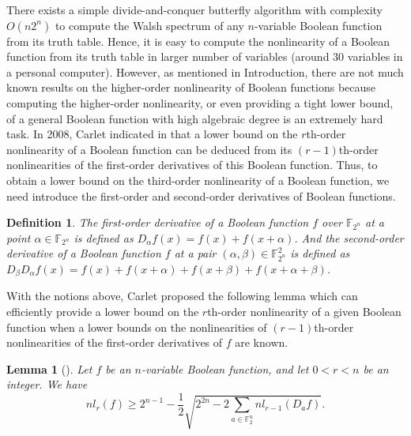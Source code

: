 \documentclass{article}
\newcommand{\F}{\mathbb{F}}
\newcommand{\0}{\textbf{0}}
\newcommand{\1}{\textbf{1}}
\theoremstyle{plain}
\newtheorem{lemma}{Lemma}
\newtheorem{definition}{Definition}
\begin{document}
    There exists a simple divide-and-conquer butterfly algorithm with complexity $O(n2^n)$ to compute the Walsh spectrum of any $n$-variable Boolean function from its truth table. 
    Hence, it is easy to compute the nonlinearity of a Boolean function from its truth table in larger number of variables (around $30$ variables in a personal computer). 
    However, as mentioned in Introduction, there are not much known results on the higher-order nonlinearity of Boolean functions because computing the higher-order nonlinearity, or even providing a tight lower bound, of a general Boolean function with high algebraic degree is an extremely hard task. 
    In 2008, Carlet indicated in \cite{Carlet2008lowbound_NL_profile} that a lower bound on the $r$th-order nonlinearity of a Boolean function can be deduced from its $(r-1)$th-order nonlinearities of the first-order derivatives of this Boolean function. 
    Thus, to obtain a lower bound on the third-order nonlinearity of a Boolean function, we need introduce the first-order and second-order derivatives of Boolean functions.
    \begin{definition}
        The first-order derivative of a Boolean function $f$ over $\F_{2^n}$ at a point $\alpha\in\F_{2^n}$ is defined as $D_{\alpha}f(x)=f(x)+f(x+\alpha)$. 
        And the second-order derivative of a Boolean function $f$ at a pair $(\alpha,\beta)\in\F_{2^n}^2$ is defined as $D_{\beta}D_{\alpha}f(x)=f(x)+f(x+\alpha)+f(x+\beta)+f(x+\alpha+\beta)$. 
    \end{definition}
    With the notions above, Carlet proposed the following lemma which can efficiently provide a lower bound on the $r$th-order nonlinearity of a given Boolean function when a lower bounds on the nonlinearities of $(r-1)$th-order nonlinearities of the first-order derivatives of $f$ are known. 
    \begin{lemma}[\cite{Carlet2008lowbound_NL_profile}]\label{thm:High_order_nl_bound1}
        Let $f$ be an $n$-variable Boolean function, and let $0<r<n$ be an integer. 
        We have 
        \[nl_r(f)\ge 2^{n-1}-\frac{1}{2}\sqrt{2^{2n}-2\sum_{a\in\F_2^n}nl_{r-1}(D_af)}.\] 
    \end{lemma}
    
\end{document}
